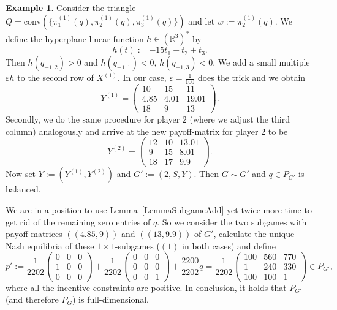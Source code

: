 \documentclass[11pt]{amsart}
\theoremstyle{definition}
\newtheorem{example}[theorem]{Example}
\numberwithin{subcase}{case}
\newcommand{\RR}{{\mathbb R}}
\begin{document}
\begin{example}
Consider the triangle $Q=
\mathrm{conv}(\{\pi^{(1)}_1(q),\pi^{(1)}_2(q),\pi^{(1)}_3(q)\})$ and
let $w:=\pi^{(1)}_2(q)$. We define the hyperplane linear function $h
\in (\RR^3)^*$ by 
\[h(t):=-15t_{1}+t_{2}+t_{3}.\] Then $h(q_{-1,2})>0$ and $h(q_{-1,1})<0$, $h(q_{-1,3})<0$. We add a small
multiple $\varepsilon h$ to the second row of $X^{(1)}$. In our case,
$\varepsilon=\frac{1}{100}$ does the trick and we obtain 
\[Y^{(1)}=\begin{pmatrix}
  10 & 15 & 11 \\
    4.85 & 4.01 & 19.01 \\
    18 & 9 & 13   
\end{pmatrix}.  \] Secondly, we do the same procedure for player $2$ (where we adjust the third column) analogously and arrive at the new payoff-matrix for player $2$ to be \[Y^{(2)}=\begin{pmatrix}
  12 & 10 & 13.01 \\
    9 & 15 & 8.01 \\
    18 & 17 & 9.9   
\end{pmatrix}.  \] Now set $Y:=(Y^{(1)},Y^{(2)})$ and $G':=(2,S,Y)$.
Then $G \sim G'$ and $q \in P_{G'}$ is balanced.

We are in a position to use Lemma~\ref{LemmaSubgameAdd} yet twice more
time to get rid of the remaining zero entries of $q$. So we consider
the two subgames with payoff-matrices $((4.85,9))$ and $((13,9.9))$
of $G'$, calculate the unique Nash equilibria  of these $1 \times 1$-subgames ($(1)$ in both cases) and define  \[ p':=\frac{1}{2202} \begin{pmatrix}
    0 & 0 & 0 \\
    1 & 0 & 0 \\
    0 & 0 & 0
\end{pmatrix}+ \frac{1}{2202} \begin{pmatrix}
    0 & 0 & 0 \\
    0 & 0 & 0 \\
    0 & 0 & 1
\end{pmatrix}+\frac{2200}{2202}q=\frac{1}{2202} \begin{pmatrix}
    100 & 560 & 770 \\
    1 & 240 & 330 \\
    100 & 100 & 1
\end{pmatrix} \in P_{G'}, \] where all the incentive constraints are positive. In conclusion, it holds that $P_{G'}$ (and therefore $P_G$) is full-dimensional. 
\end{example}





\end{document}

